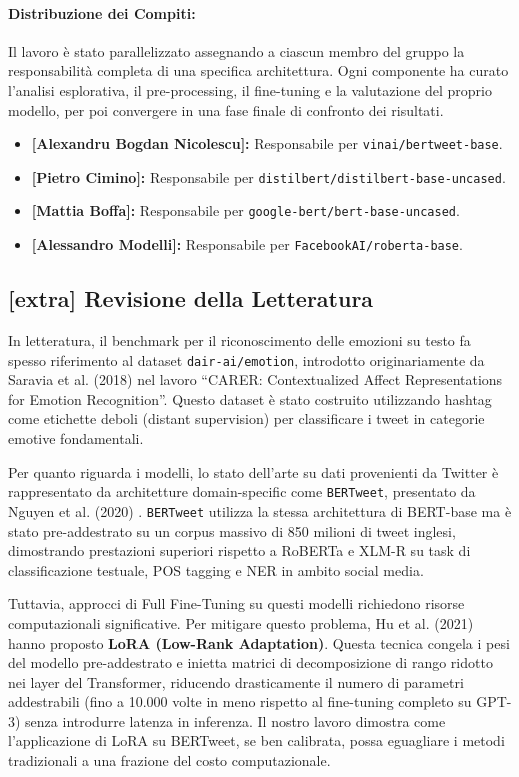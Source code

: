 \documentclass[a4paper,12pt]{article}
\begin{document}
\paragraph{Distribuzione dei Compiti:}
Il lavoro è stato parallelizzato assegnando a ciascun membro del gruppo la responsabilità completa di una specifica architettura.
Ogni componente ha curato l'analisi esplorativa, il pre-processing, il fine-tuning e la valutazione del proprio modello, per poi
convergere in una fase finale di confronto dei risultati.

\begin{itemize}
    \item \textbf{[Alexandru Bogdan Nicolescu]:} Responsabile per \texttt{vinai/bertweet-base}.
    \item \textbf{[Pietro Cimino]:} Responsabile per \texttt{distilbert/distilbert-base-uncased}.
    \item \textbf{[Mattia Boffa]:} Responsabile per \texttt{google-bert/bert-base-uncased}.
    \item \textbf{[Alessandro Modelli]:} Responsabile per \texttt{FacebookAI/roberta-base}.
\end{itemize}

\subsection{[extra] Revisione della Letteratura}
In letteratura, il benchmark per il riconoscimento delle emozioni su testo fa spesso riferimento al
dataset \texttt{dair-ai/emotion}, introdotto originariamente da Saravia et al. (2018)\cite{saravia-etal-2018-carer} nel
lavoro ``CARER: Contextualized Affect Representations for Emotion Recognition''.
Questo dataset è stato costruito utilizzando hashtag come etichette deboli (distant supervision)
per classificare i tweet in categorie emotive fondamentali.

Per quanto riguarda i modelli, lo stato dell'arte su dati provenienti da Twitter è rappresentato da
architetture domain-specific come \texttt{BERTweet}, presentato da Nguyen et al. (2020) \cite{nguyen-etal-2020-bertweet}.
\texttt{BERTweet} utilizza la stessa architettura di BERT-base ma è stato
pre-addestrato su un corpus massivo di 850 milioni di tweet inglesi, dimostrando prestazioni superiori
rispetto a RoBERTa e XLM-R su task di classificazione testuale, POS tagging e NER in ambito social
media.

Tuttavia, approcci di Full Fine-Tuning su questi modelli richiedono risorse computazionali significative.
Per mitigare questo problema, Hu et al. (2021) \cite{LoRA} hanno proposto \textbf{LoRA (Low-Rank Adaptation)}. Questa tecnica congela i pesi del modello pre-addestrato e inietta matrici di
decomposizione di rango ridotto nei layer del Transformer, riducendo drasticamente il numero di parametri
addestrabili (fino a 10.000 volte in meno rispetto al fine-tuning completo su GPT-3) senza introdurre
latenza in inferenza. Il nostro lavoro dimostra come l'applicazione di LoRA su BERTweet,
se ben calibrata, possa eguagliare i metodi tradizionali a una frazione del costo computazionale.
\end{document}
